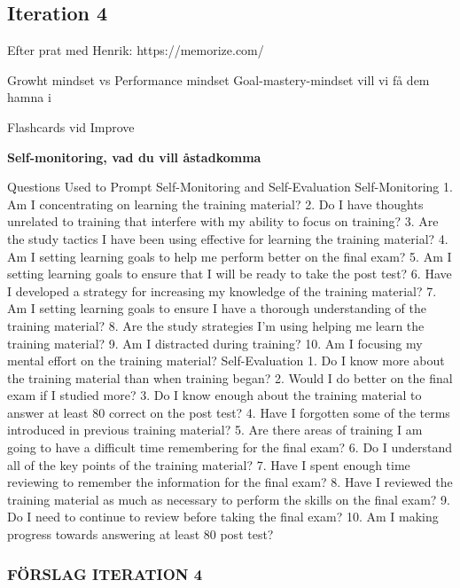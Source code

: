 \subsection{Iteration 4}

Efter prat med Henrik:
https://memorize.com/

Growht mindset vs Performance mindset
Goal-mastery-mindset vill vi få dem hamna i

Flashcards vid Improve

\textbf{Self-monitoring, vad du vill åstadkomma}

Questions Used to Prompt Self-Monitoring and Self-Evaluation
Self-Monitoring
1. Am I concentrating on learning the training material?
2. Do I have thoughts unrelated to training that interfere with my ability to focus on training?
3. Are the study tactics I have been using effective for learning the training material?
4. Am I setting learning goals to help me perform better on the final exam?
5. Am I setting learning goals to ensure that I will be ready to take the post test?
6. Have I developed a strategy for increasing my knowledge of the training material?
7. Am I setting learning goals to ensure I have a thorough understanding of the training
material?
8. Are the study strategies I'm using helping me learn the training material?
9. Am I distracted during training?
10. Am I focusing my mental effort on the training material?
Self-Evaluation
1. Do I know more about the training material than when training began?
2. Would I do better on the final exam if I studied more?
3. Do I know enough about the training material to answer at least 80%
correct on the post test?
4. Have I forgotten some of the terms introduced in previous training material?
5. Are there areas of training I am going to have a difficult time remembering for the final
exam?
6. Do I understand all of the key points of the training material?
7. Have I spent enough time reviewing to remember the information for the final exam?
8. Have I reviewed the training material as much as necessary to perform the skills on the
final exam?
9. Do I need to continue to review before taking the final exam?
10. Am I making progress towards answering at least 80%
post test?

\subsubsection{FÖRSLAG ITERATION 4}

